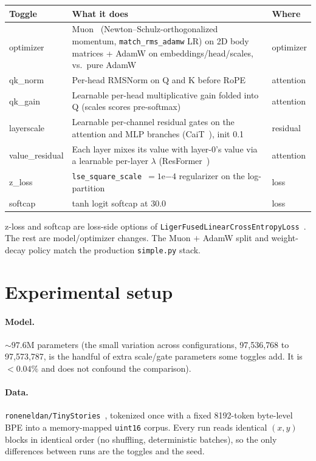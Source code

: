 \documentclass[11pt]{article}
\begin{document}
\begin{table}[h]
\centering
\small
\begin{tabular}{@{}lp{8.2cm}l@{}}
\toprule
\textbf{Toggle} & \textbf{What it does} & \textbf{Where} \\
\midrule
optimizer & Muon~\cite{jordan2024muon} (Newton--Schulz-orthogonalized momentum, \texttt{match\_rms\_adamw} LR) on 2D body matrices + AdamW on embeddings/head/scales, vs.\ pure AdamW & optimizer \\
qk\_norm & Per-head RMSNorm on Q and K before RoPE~\cite{henry2020qknorm} & attention \\
qk\_gain & Learnable per-head multiplicative gain folded into Q (scales scores pre-softmax) & attention \\
layerscale & Learnable per-channel residual gates on the attention and MLP branches (CaiT~\cite{touvron2021cait}), init 0.1 & residual \\
value\_residual & Each layer mixes its value with layer-0's value via a learnable per-layer $\lambda$ (ResFormer~\cite{zhou2024resformer}) & attention \\
z\_loss & \texttt{lse\_square\_scale}~$=1\mathrm{e}{-4}$ regularizer on the log-partition~\cite{chowdhery2023palm} & loss \\
softcap & tanh logit softcap at 30.0 & loss \\
\bottomrule
\end{tabular}
\end{table}

z-loss and softcap are loss-side options of
\texttt{LigerFusedLinearCrossEntropyLoss}~\cite{hsu2024liger}. The rest are
model/optimizer changes.
The Muon $+$ AdamW split and weight-decay policy match the production
\texttt{simple.py} stack.

\section{Experimental setup}

\paragraph{Model.} ${\sim}97.6$M parameters (the small variation across
configurations, 97{,}536{,}768 to 97{,}573{,}787, is the handful of extra
scale/gate parameters some toggles add. It is ${<}0.04\%$ and does not confound
the comparison).

\paragraph{Data.} \texttt{roneneldan/TinyStories}~\cite{eldan2023tinystories}, tokenized once with a fixed
8192-token byte-level BPE into a memory-mapped \texttt{uint16} corpus. Every run
reads identical $(x,y)$ blocks in identical order (no shuffling, deterministic
batches), so the only differences between runs are the toggles and the seed.
\end{document}
